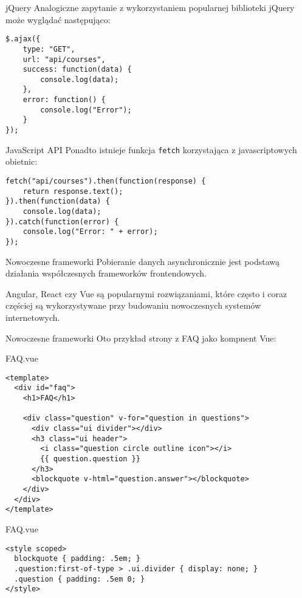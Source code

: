 \begin{frame}[fragile]{jQuery}
	Analogiczne zapytanie z wykorzystaniem popularnej biblioteki jQuery może wyglądać następująco:
	
	\begin{lstlisting}
$.ajax({
    type: "GET",
    url: "api/courses",
    success: function(data) {
        console.log(data);
    },
    error: function() {
        console.log("Error");
    }
});
	\end{lstlisting}
\end{frame}

\begin{frame}[fragile]{JavaScript API}
	Ponadto istnieje funkcja \texttt{fetch} korzystająca z javascriptowych obietnic:
	
	\begin{lstlisting}
fetch("api/courses").then(function(response) {
    return response.text();
}).then(function(data) {
    console.log(data);
}).catch(function(error) {
    console.log("Error: " + error);
});
	\end{lstlisting}
\end{frame}

\begin{frame}{Nowoczesne frameworki}
	Pobieranie danych asynchronicznie jest podstawą działania współczesnych frameworków frontendowych.
	
	Angular, React czy Vue są popularnymi rozwiązaniami, które często i coraz częściej są wykorzystywane przy budowaniu nowoczesnych systemów internetowych.
\end{frame}

\begin{frame}{Nowoczesne frameworki}
	Oto przykład strony z FAQ jako kompnent Vue:
\end{frame}

\begin{frame}[fragile]{FAQ.vue}	
	\begin{lstlisting}
<template>
  <div id="faq">
    <h1>FAQ</h1>

    <div class="question" v-for="question in questions">
      <div class="ui divider"></div>
      <h3 class="ui header">
        <i class="question circle outline icon"></i>
        {{ question.question }}
      </h3>
      <blockquote v-html="question.answer"></blockquote>
    </div>
  </div>
</template>
	\end{lstlisting}
\end{frame}

\begin{frame}[fragile]{FAQ.vue}	
	\begin{lstlisting}
<style scoped>
  blockquote { padding: .5em; }
  .question:first-of-type > .ui.divider { display: none; }
  .question { padding: .5em 0; }
</style>
	\end{lstlisting}
\end{frame}

